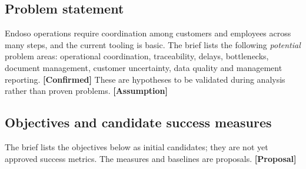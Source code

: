 \documentclass[11pt,a4paper]{article}
\newcommand{\tagconf}{\textcolor{green!45!black}{\textbf{[Confirmed]}}}
\newcommand{\tagprop}{\textcolor{orange!80!black}{\textbf{[Proposal]}}}
\newcommand{\tagassm}{\textcolor{blue!60!black}{\textbf{[Assumption]}}}
\begin{document}
\subsection{Problem statement}

Endoso operations require coordination among customers and employees across many
steps, and the current tooling is basic. The brief lists the following
\emph{potential} problem areas: operational coordination, traceability, delays,
bottlenecks, document management, customer uncertainty, data quality and
management reporting. \tagconf{} These are hypotheses to be validated during
analysis rather than proven problems. \tagassm{}

\subsection{Objectives and candidate success measures}

The brief lists the objectives below as initial candidates; they are not yet
approved success metrics. The measures and baselines are proposals. \tagprop{}
\end{document}
